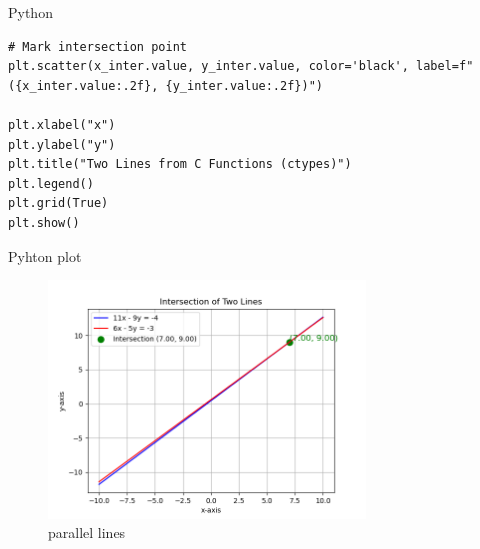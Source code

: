 \documentclass{beamer}
\begin{document}
\begin{frame}[fragile]{Python}
\begin{lstlisting}
# Mark intersection point
plt.scatter(x_inter.value, y_inter.value, color='black', label=f"({x_inter.value:.2f}, {y_inter.value:.2f})")

plt.xlabel("x")
plt.ylabel("y")
plt.title("Two Lines from C Functions (ctypes)")
plt.legend()
plt.grid(True)
plt.show()
\end{lstlisting}
\end{frame}
\begin{frame}{Pyhton plot}
\begin{figure}[h!]
    \centering
    \includegraphics[width=0.75\textwidth]{figs/12.png}
    \caption{parallel lines}
    \label{fig:example_image}
\end{figure}
\end{frame}
\end{document}

